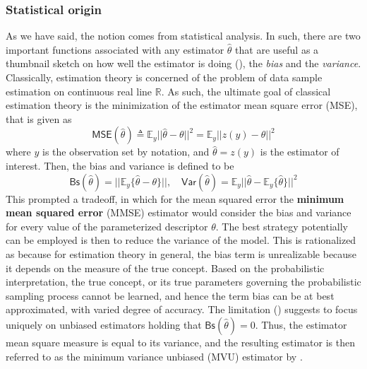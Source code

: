 \documentclass[10pt]{article}
\begin{document}
\subsubsection{Statistical origin}
As we have said, the notion comes from statistical analysis. In such, there are two important functions associated with any estimator $\hat{\theta}$ that are useful as a thumbnail sketch on how well the estimator is doing (\cite{liam_statistics_2005}), the \textit{bias} and the \textit{variance}. Classically, estimation theory is concerned of the problem of data sample estimation on continuous real line $\mathbb{R}$. As such, the ultimate goal of classical estimation theory is the minimization of the estimator mean square error (MSE), that is given as 
\begin{equation}
  \mathsf{MSE}(\hat{\theta}) \triangleq \mathbb{E}_{y} \lvert \lvert \hat{\theta} - \theta \rvert \rvert^{2} = \mathbb{E}_{y} \lvert\lvert z(y) - \theta \rvert \rvert^{2}
\end{equation}
where $y$ is the observation set by notation, and $\hat{\theta}=z(y)$ is the estimator of interest. Then, the bias and variance is defined to be
\begin{equation}
  \mathsf{Bs}(\hat{\theta}) = \lvert\lvert \mathbb{E}_{y} \{\hat{\theta} - \theta\}\rvert\rvert, \quad \mathsf{Var}(\hat{\theta}) = \mathbb{E}_{y} \lvert\lvert \hat{\theta} - \mathbb{E}_{y} \{\hat{\theta}\}\vert\rvert^{2}
\end{equation}
This prompted a tradeoff, in which for the mean squared error the \textbf{minimum mean squared error} (MMSE) estimator would consider the bias and variance for every value of the parameterized descriptor $\theta$. The best strategy potentially can be employed is then to reduce the variance of the model. This is rationalized as because for estimation theory in general, the bias term is unrealizable because it depends on the measure of the true concept. Based on the probabilistic interpretation, the true concept, or its true parameters governing the probabilistic sampling process cannot be learned, and hence the term bias can be at best approximated, with varied degree of accuracy. The limitation (\cite{piera_sample_2005,MkayPretenceSignalStatistics1993}) suggests to focus uniquely on unbiased estimators holding that $\mathsf{Bs}(\hat{\theta})=0$. Thus, the estimator mean square measure is equal to its variance, and the resulting estimator is then referred to as the minimum variance unbiased (MVU) estimator by \cite{MkayPretenceSignalStatistics1993}. 
\end{document}
